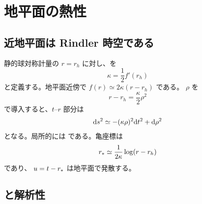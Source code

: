 \chapter{地平面の熱性}
\label{chap:horizon-thermality}


\section{近地平面は Rindler 時空である}

静的球対称計量の $r=r_h$ に対し、を
\begin{equation}
\kappa
=
\frac{1}{2}f'(r_h)
\label{eq:surface-gravity-static}
\end{equation}
と定義する。地平面近傍で $f(r)\simeq2\kappa(r-r_h)$ である。 $\rho$ を
\begin{equation}
r-r_h
=
\frac{\kappa}{2}\rho^2
\end{equation}
で導入すると、$t$--$r$ 部分は
\begin{equation}
\mathrm{d} s^2
\simeq
-(\kappa\rho)^2\mathrm{d} t^2
+\mathrm{d}\rho^2
\label{eq:near-horizon-rindler}
\end{equation}
となる。局所的には である。亀座標は
\begin{equation}
r_*
\simeq
\frac{1}{2\kappa}
\log(r-r_h)
\end{equation}
であり、 $u=t-r_*$ は地平面で発散する。

\section{と解析性}

